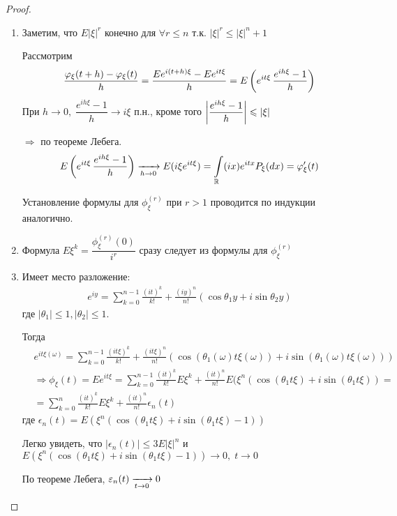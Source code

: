 \begin{proof}~

  \begin{enumerate}
    \item
      Заметим, что $E|\xi|^r$ конечно для $\forall r \leq n$ т.к. $|\xi|^r \leq |\xi|^n + 1$

      Рассмотрим 
      \begin{align*}
        \frac{\varphi_\xi(t + h) - \varphi_\xi (t)}{h} = \frac{E e^{i (t + h) \xi} - E e^{i t \xi}}{h}
        = E \left( e^{i t \xi}\, \frac{e^{i h \xi} - 1}{h} \right)
      \end{align*}
      При $h \to 0, \; \dfrac{e^{i h \xi} - 1}{h} \to i \xi$ п.н., 
      кроме того $\left |  \dfrac{e^{i h \xi} - 1}{h}  \right | \leqslant |\xi|$

      $\Rightarrow$ по теореме Лебега.
      \begin{align*}
        E \left( e^{i t \xi}\, \frac{e^{i h \xi} - 1}{h} \right) \xrightarrow[h \to 0]{} E(i \xi e^{i t \xi})
        = \int\limits_{\mathbb{R}} (i x) e^{i t x} P_\xi (dx) = \varphi'_{\xi} (t)
      \end{align*}

      Установление формулы для $\phi_{\xi}^{(r)}$ при $r > 1$ проводится по индукции аналогично.

    \item
      Формула $E \xi^k = \dfrac{\phi_{\xi}^{(r)} (0)}{i^r}$ сразу следует 
      из формулы для $\phi_\xi^{(r)}$

    \item
      Имеет место разложение:
      \begin{align*}
        e^{i y} = \sum_{k = 0}^{n - 1} \frac{(i t)^k}{k!} 
        + \frac{(i y)^n}{n!} (\cos \theta_1 y + i \sin \theta_2 y)
      \end{align*}
      где $|\theta_1| \leq 1, |\theta_2| \leq 1$.

      Тогда 
      \begin{align*}
        &e^{i t \xi(\omega)} = \sum_{k = 0}^{n - 1} \frac{(i t \xi)^k}{k!} 
        + \frac{(i t \xi)^n}{n!} (\cos (\theta_1(\omega) t \xi(\omega)) 
        + i \sin (\theta_1(\omega) t \xi(\omega)))\\
        &\Rightarrow \phi_{\xi} (t) = E e^{i t \xi} 
        = \sum_{k = 0}^{n - 1} \frac{(i t)^k}{k!} E \xi^k
        + \frac{(i t)^n}{n!} E (\xi^n (\cos (\theta_1 t \xi) + i \sin (\theta_1 t \xi)) =\\
        &= \sum_{k = 0}^{n} \frac{(i t)^k}{k!} E \xi^k + \frac{(i t)^n}{n!} \epsilon_n (t)
      \end{align*}
      где $\epsilon_n (t) = E (\xi^n (\cos (\theta_1 t \xi) + i \sin (\theta_1 t \xi) - 1))$
      
      Легко увидеть, что $|\epsilon_n (t)| \leq 3 E |\xi|^n$ и
      $E (\xi^n (\cos (\theta_1 t \xi) + i \sin (\theta_1 t \xi) - 1)) \to 0,\; t \to 0$

      По теореме Лебега, $\varepsilon_n(t) \xrightarrow[t \to 0]{} 0$
  \end{enumerate}
\end{proof}

